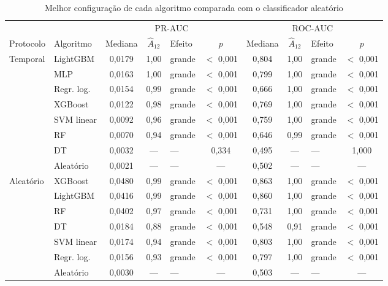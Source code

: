 \begin{table}[htbp]
    
    \centering
    \scriptsize
    \setlength{\tabcolsep}{3pt}%
    \caption{Melhor configuração de cada algoritmo comparada com o classificador aleatório}
    \label{tab:res-a12-acaso}
    \begin{tabular}{llcclc|cclc}
        \toprule
         & & \multicolumn{4}{c|}{PR-AUC} & \multicolumn{4}{c}{ROC-AUC} \\
        \cmidrule(lr){3-6}\cmidrule(lr){7-10}
        Protocolo & Algoritmo & Mediana & $\hat{A}_{12}$ & Efeito & $p$ & Mediana & $\hat{A}_{12}$ & Efeito & $p$ \\
        \midrule
        Temporal & LightGBM & 0,0179 & 1,00 & grande & $<$ 0,001 & 0,804 & 1,00 & grande & $<$ 0,001 \\
         & MLP & 0,0163 & 1,00 & grande & $<$ 0,001 & 0,799 & 1,00 & grande & $<$ 0,001 \\
         & Regr. log. & 0,0154 & 0,99 & grande & $<$ 0,001 & 0,666 & 1,00 & grande & $<$ 0,001 \\
         & XGBoost & 0,0122 & 0,98 & grande & $<$ 0,001 & 0,769 & 1,00 & grande & $<$ 0,001 \\
         & SVM linear & 0,0092 & 0,96 & grande & $<$ 0,001 & 0,759 & 1,00 & grande & $<$ 0,001 \\
         & RF & 0,0070 & 0,94 & grande & $<$ 0,001 & 0,646 & 0,99 & grande & $<$ 0,001 \\
         & DT & 0,0032 & --- & --- & 0,334 & 0,495 & --- & --- & 1,000 \\
         & Aleatório & 0,0021 & --- & --- & --- & 0,502 & --- & --- & --- \\
        \midrule
        Aleatório & XGBoost & 0,0480 & 0,99 & grande & $<$ 0,001 & 0,863 & 1,00 & grande & $<$ 0,001 \\
         & LightGBM & 0,0416 & 0,99 & grande & $<$ 0,001 & 0,860 & 1,00 & grande & $<$ 0,001 \\
         & RF & 0,0402 & 0,97 & grande & $<$ 0,001 & 0,731 & 1,00 & grande & $<$ 0,001 \\
         & DT & 0,0184 & 0,88 & grande & $<$ 0,001 & 0,548 & 0,91 & grande & $<$ 0,001 \\
         & SVM linear & 0,0174 & 0,94 & grande & $<$ 0,001 & 0,803 & 1,00 & grande & $<$ 0,001 \\
         & Regr. log. & 0,0156 & 0,93 & grande & $<$ 0,001 & 0,797 & 1,00 & grande & $<$ 0,001 \\
         & Aleatório & 0,0030 & --- & --- & --- & 0,503 & --- & --- & --- \\
        \bottomrule
    \end{tabular}
\end{table}%
